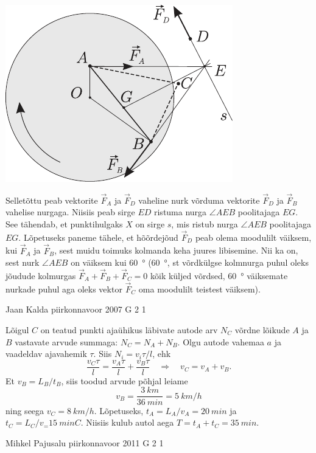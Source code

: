 \documentclass[11pt, twoside]{article}
\begin{document}
{{\begin{center}
	\includegraphics[width=0.7\linewidth]{2005-v3g-10-lah}
\end{center}

Selletõttu peab vektorite $\vec F_A$ ja $\vec F_D$ vaheline nurk võrduma vektorite $\vec F_D$ ja $\vec F_B$ vahelise nurgaga. Niisiis peab sirge $ED$ ristuma nurga $\angle AEB$ poolitajaga $EG$. See tähendab, et punktihulgaks $X$ on sirge $s$, mis ristub nurga $\angle AEB$ poolitajaga $EG$. Lõpetuseks paneme tähele, et hõõrdejõud $\vec F_D$ peab olema moodulilt väiksem, kui $\vec F_A$ ja $\vec F_B$, sest muidu toimuks kolmanda keha juures libisemine. Nii ka on, sest nurk $\angle AEB$ on väiksem kui \SI{60}{\degree} (\SI{60}{\degree}, st võrdkülgse kolmnurga puhul oleks jõudude kolmurgas $\vec F_A + \vec F_B + \vec F_C = 0$ kõik küljed võrdsed, \SI{60}{\degree} väiksemate nurkade puhul aga oleks vektor $\vec F_C$ oma moodulilt teistest väiksem).
\fi
}

{Jaan Kalda} %
{piirkonnavoor} %
{2007} %
{G 2} %
{1} %
{

\ifSolution
Lõigul $C$ on teatud punkti ajaühikus läbivate autode arv $N_C$ võrdne lõikude $A$ ja $B$ vastavate arvude summaga: $N_C = N_A + N_B$. Olgu autode vahemaa $a$ ja vaadeldav ajavahemik $\tau$. Siis $N_i = v_i\tau /l$, ehk 
\[
\frac{v_{C} \tau}{l}=\frac{v_{A} \tau}{l}+\frac{v_{B} \tau}{l} \quad \Rightarrow \quad v_{C}=v_{A}+v_{B}.
\]
Et $v_B = L_B/t_B$, siis toodud arvude põhjal leiame 
\[
v_{B}=\frac{\SI{3}{km}}{\SI{36}{min}}=\SI{5}{km/h}
\]
ning seega $v_C = \SI{8}{km/h}$. Lõpetuseks, $t_A = L_A/v_A=\SI{20}{min}$ ja $t_C = L_C/v_ = \SI{15}{min}C$. Niisiis kulub autol aega $T = t_A + t_C = \SI{35}{min}$.
\fi
}

{Mihkel Pajusalu} %
{piirkonnavoor} %
{2011} %
{G 2} %
{1} %
{

}}
\end{document}
